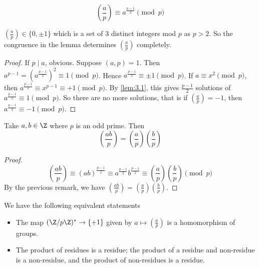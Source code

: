 \documentclass{article}
\newcommand{\legendre}[2]{\genfrac{(}{)}{}{}{#1}{#2}}
\begin{document}
\begin{lemma}
    \begin{equation*}
        \legendre{a}{p} \equiv a^{\frac{p-1}{2}} \pmod{p}
    \end{equation*}
\end{lemma}

\begin{remark}
    $\legendre{a}{p} \in \{0, \pm 1\}$ which is a set of $3$ distinct integers mod $p$ as $p > 2$. So the congruence in the lemma determines $\legendre{a}{p}$ completely.
\end{remark}

\begin{proof}
    If $p \mid a$, obvious. Suppose $(a, p) = 1$. Then $a^{p-1} = \left(a^{\frac{p-1}{2}}\right)^2 \equiv 1 \pmod{p}$.
    Hence $a^{\frac{p-1}{2}} \equiv \pm 1 \pmod{p}$. If $a \equiv x^2 \pmod{p}$, then $a^{\frac{p-1}{2}} \equiv x^{p-1} \equiv +1 \pmod{p}$.
    By \cref{lem:3.1}, this gives $\frac{p-1}{2}$ solutions of $a^{\frac{p-1}{2}} \equiv 1 \pmod{p}$.
    So there are no more solutions, that is if $\legendre{a}{p} = -1$, then $a^{\frac{p-1}{2}} \equiv -1 \pmod{p}$.
\end{proof}

\begin{ncor}\label{cor:3.2}
    Take $a, b \in \Z$ where $p$ is an odd prime. Then
    \begin{equation*}
        \legendre{ab}{p} = \legendre{a}{p} \legendre{b}{p}
    \end{equation*}
\end{ncor}

\begin{proof}
    \begin{equation*}
        \legendre{ab}{p} \equiv (ab)^{\frac{p-1}{2}} \equiv a^{\frac{p-1}{2}} b^{\frac{p-1}{2}} \equiv \legendre{a}{p} \legendre{b}{p} \pmod{p}
    \end{equation*}
    By the previous remark, we have $\legendre{ab}{p} = \legendre{a}{p} \legendre{b}{p}$.
\end{proof}

\begin{remark}
    We have the following equivalent statements
    \begin{itemize}
        \item The map $(\Z/ p\Z)^* \to \{+1\}$ given by $a \mapsto \legendre{a}{p}$ is a homomorphism of groups.
        \item The product of residues is a residue; the product of a residue and non-residue is a non-residue, and the product of non-residues is a residue.
    \end{itemize}
\end{remark}
\end{document}

